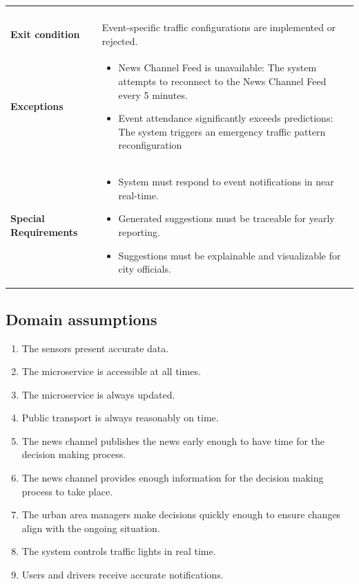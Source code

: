 \documentclass[11.5pt]{article}
\begin{document}
\begin{table}[H]
\begin{tabular}{@{} l p{23em} @{}}
\begin{enumerate}[left=0pt, parsep=0pt, topsep=0pt]
            \end{enumerate}
             \\
            \textbf{Exit condition} & Event-specific traffic configurations are implemented or rejected. \\
            \textbf{Exceptions} & 
            \begin{itemize}[left=0pt, parsep=0pt, topsep=0pt]
                \item News Channel Feed is unavailable: The system attempts to reconnect to the News Channel Feed every 5 minutes.
                \item Event attendance significantly exceeds predictions: The system triggers an emergency traffic pattern reconfiguration
            \end{itemize} \\
            \textbf{Special Requirements} & 
            \begin{itemize}[left=0pt, parsep=0pt, topsep=0pt]
                \item System must respond to event notifications in near real-time.
                \item Generated suggestions must be traceable for yearly reporting.
                \item Suggestions must be explainable and visualizable for city officials.
            \end{itemize} \\
            \bottomrule
        \end{tabular}
    \end{table}
    \subsection{Domain assumptions}
    \begin{enumerate}
        \item The sensors present accurate data.
        \item The microservice is accessible at all times.
        \item The microservice is always updated.
        \item Public transport is always reasonably on time.
        \item The news channel publishes the news early enough to have time for the decision making process.
        \item The news channel provides enough information for the decision making process to take place.
        \item The urban area managers make decisions quickly enough to ensure changes align with the ongoing situation.
        \item The system controls traffic lights in real time.
        \item Users and drivers receive accurate notifications.
    \end{enumerate}
\end{document}
